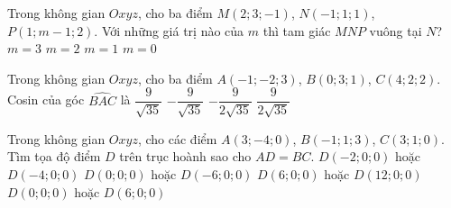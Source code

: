 \begin{ex}%
	Trong không gian $Oxyz$, cho ba điểm $M(2;3;-1 )$, $N(-1;1;1 )$, $P(1;m-1;2 )$. Với những giá trị nào của $m$ thì tam giác $MNP$ vuông tại $N$?
	\choice 
	{ $m=3$ }
	{ $m=2$ }
	{ $m=1$ }
	{ \True $m=0$ } 
\end{ex}
\begin{ex}%
	Trong không gian $Oxyz$, cho ba điểm $A(-1;-2;3)$, $B(0;3;1)$, $C(4;2;2)$. Cosin của góc $\widehat{BAC}$ là
	\choice
	{$\dfrac{9}{\sqrt{35}}$}
	{$-\dfrac{9}{\sqrt{35}}$}
	{$-\dfrac{9}{2\sqrt{35}}$}
	{\True $\dfrac{9}{2\sqrt{35}}$}
\end{ex}
\begin{ex}%
	Trong không gian $Oxyz$, cho các điểm $A(3;-4;0)$, $B(-1;1;3)$, $C(3;1;0)$. Tìm tọa độ điểm $D$ trên trục hoành sao cho $AD=BC$.
	\choice 
	{$D(-2;0;0)$ hoặc $D(-4;0;0)$}
	{$D(0;0;0)$ hoặc $D(-6;0;0)$}
	{$D(6;0;0)$ hoặc $D(12;0;0)$}
	{\True $D(0;0;0)$ hoặc $D(6;0;0)$}
\end{ex}
